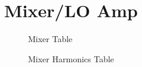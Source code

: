 \section{Mixer/LO Amp}
\begin{figure}[H]
  \centering
  \caption{Mixer Table}
  \label{img:mixertable}
\end{figure}
\begin{figure}[H]
  \centering
  \caption{Mixer Harmonics Table}
  \label{img:mixerharmonics}
\end{figure}

